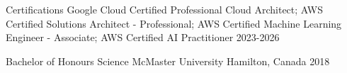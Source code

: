 
\begin{cvhonors}

  \cvhonor
    {Certifications} %
    {Google Cloud Certified Professional Cloud Architect; AWS Certified Solutions Architect - Professional; AWS Certified Machine Learning Engineer - Associate; AWS Certified AI Practitioner} %
    {} %
    {2023-2026} %

  \cvhonor
    {Bachelor of Honours Science} %
    {McMaster University} %
    {Hamilton, Canada} %
    {2018} %

\end{cvhonors}
